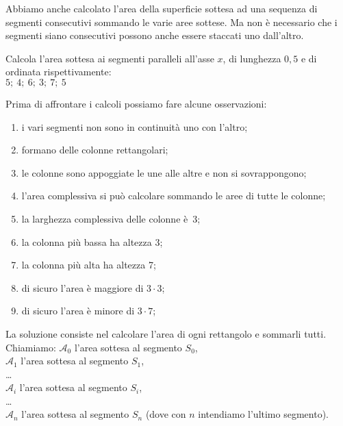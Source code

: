 Abbiamo anche calcolato l'area della superficie sottesa ad una sequenza di 
segmenti consecutivi sommando le varie aree sottese. Ma non è necessario che 
i segmenti siano consecutivi possono anche essere staccati uno dall'altro.

\begin{esempio}
Calcola l'area sottesa ai segmenti paralleli all'asse \(x\), di lunghezza 
\(0,5\) e di ordinata rispettivamente: \\ 
\(5;~4;~6;~3;~7;~5\)
\begin{minipage}{.29\textwidth}
\begin{inaccessibleblock}
  \areasottesasegmenti
\end{inaccessibleblock}
\end{minipage}
\hfill
\begin{minipage}{.69\textwidth}
Prima di affrontare i calcoli possiamo fare alcune osservazioni:
\begin{enumerate} [nosep]
 \item i vari segmenti non sono in continuità uno con l'altro;
 \item formano delle colonne rettangolari;
 \item le colonne sono appoggiate le une alle altre e non si sovrappongono;
 \item l'area complessiva si può calcolare sommando le aree di tutte le 
colonne;
 \item la larghezza complessiva delle colonne è~3;
 \item la colonna più bassa ha altezza 3;
 \item la colonna più alta ha altezza 7;
 \item di sicuro l'area è maggiore di \(3 \cdot 3\);
 \item di sicuro l'area è minore di \(3 \cdot 7\);
\end{enumerate}
\end{minipage}
\end{esempio}

La soluzione consiste nel calcolare l'area di ogni rettangolo e sommarli 
tutti.
Chiamiamo:
\(\mathcal{A}_0\) l'area sottesa al segmento \(S_0\),\\
\(\mathcal{A}_1\) l'area sottesa al segmento \(S_1\),\\
\dots\\
\(\mathcal{A}_i\) l'area sottesa al segmento \(S_i\),\\
\dots\\
\(\mathcal{A}_n\) l'area sottesa al segmento \(S_n\)
\quad
(dove con \(n\) intendiamo l'ultimo segmento).\\

